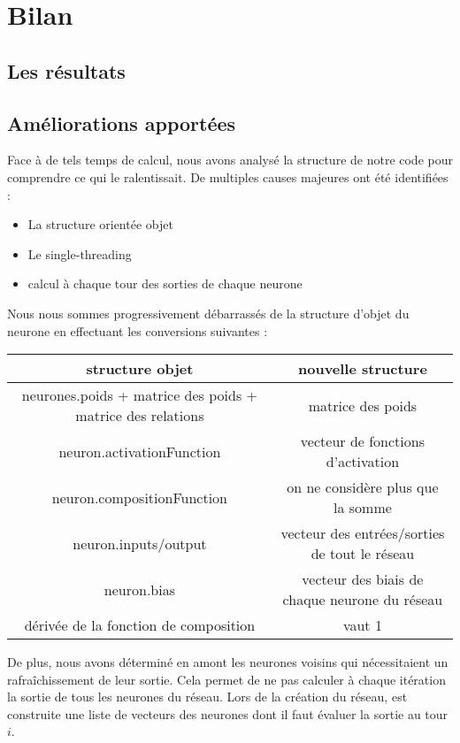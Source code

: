 \section{Bilan}


\subsection{Les résultats}



\subsection{Améliorations apportées}

Face à de tels temps de calcul, nous avons analysé la structure de notre code
pour comprendre ce qui le ralentissait. De multiples causes majeures ont été
identifiées :
\begin{itemize}
\item La structure orientée objet
\item Le single-threading
\item calcul à chaque tour des sorties de chaque neurone
\end{itemize}

\medskip

Nous nous sommes progressivement débarrassés de la structure d'objet du neurone
en effectuant les conversions suivantes :

\medskip

\begin{tabular}{c|c}
   structure objet & nouvelle structure \\
   \hline
   neurones.poids + matrice des poids + matrice des relations & matrice des poids \\
   neuron.activationFunction & vecteur de fonctions d'activation \\
   neuron.compositionFunction & on ne considère plus que la somme \\
   neuron.inputs/output & vecteur des entrées/sorties de tout le réseau \\
   neuron.bias & vecteur des biais de chaque neurone du réseau \\
   dérivée de la fonction de composition & vaut 1
\end{tabular}

\medskip

De plus, nous avons déterminé en amont les neurones voisins qui nécessitaient
un rafraîchissement de leur sortie. Cela permet de ne pas calculer à chaque
itération la sortie de tous les neurones du réseau. Lors de la création du
réseau, est construite une liste de vecteurs des neurones dont il faut évaluer
la sortie au tour $i$.
